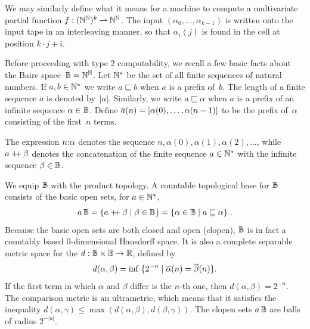 We may similarly define what it means for a machine to compute a
multivariate partial function $f : (\mathbb{N}^{\mathbb{N}})^k \mathbin{\rightharpoonup} \mathbb{N}^{\mathbb{N}}$. The
input $(\alpha_0, \ldots, \alpha_{k-1})$ is written onto the input tape in
an interleaving manner, so that $\alpha_i(j)$ is found in the cell at
position $k \cdot j + i$.

Before proceeding with type 2 computability, we recall a few basic
facts about the Baire space~$\mathbb{B} = \mathbb{N}^{\mathbb{N}}$. Let $\mathbb{N}^{*}$ be the
set of all finite sequences of natural numbers. If $a, b \in \mathbb{N}^{*}$
we write $a \sqsubseteq b$ when $a$ is a prefix of~$b$. The length of
a finite sequence $a$ is denoted by~$|a|$. Similarly, we write $a
\sqsubseteq \alpha$ when $a$ is a prefix of an infinite sequence
$\alpha \in \mathbb{B}$. Define $\overline{a}(n) = [\alpha(0), \ldots,
\alpha(n-1)]$ to be the prefix of~$\alpha$ consisting of the
first~$n$ terms.

The expression $n {:} \alpha$ denotes the sequence $n, \alpha(0),
\alpha(1), \alpha(2), \ldots$, while $a \mathbin{{+}\!\!{+}} \beta$ denotes the
concatenation of the finite sequence $a \in \mathbb{N}^{*}$ with the infinite
sequence $\beta \in \mathbb{B}$.

We equip $\mathbb{B}$ with the product topology. A countable topological
base for $\mathbb{B}$ consists of the basic open sets, for $a \in
\mathbb{N}^{*}$,
%
\begin{equation*}
  a\,\mathbb{B}
  = \{a \mathbin{{+}\!\!{+}} \beta \mid \beta \in \mathbb{B}\}
  = \{\alpha \in \mathbb{B} \mid a \sqsubseteq \alpha\}
  \;.
\end{equation*}
%
Because the basic open sets are both closed and open (clopen),
$\mathbb{B}$ is in fact a countably based $0$-dimensional Hausdorff space. It is also a complete
separable metric space for the  $d : \mathbb{B}
\times \mathbb{B} \to \mathbb{R}$, defined by
%
\begin{equation*}
  d(\alpha, \beta) = \inf \;\{2^{-n} \mid
    \overline{\alpha}(n) = \overline{\beta}(n)\}.
\end{equation*}
%
If the first term in which $\alpha$ and $\beta$ differ is the $n$-th
one, then $d(\alpha, \beta) = 2^{-n}$. The comparison metric is an
ultrametric, which means that it satisfies the inequality $d(\alpha,
\gamma) \leq \max(d(\alpha, \beta), d(\beta, \gamma))$. The clopen
sets $a\,\mathbb{B}$ are balls of radius $2^{-|a|}$.

